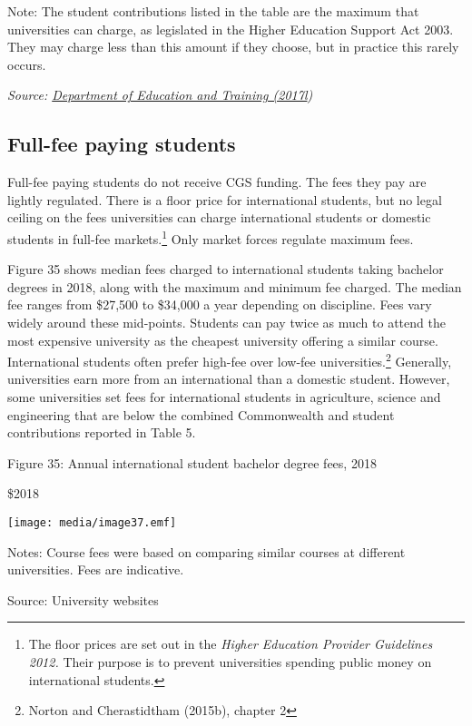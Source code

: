 \documentclass[]{book}
\begin{document}
Note: The student contributions listed in the table are the maximum that universities can charge, as legislated in the Higher Education Support Act 2003. They may charge less than this amount if they choose, but in practice this rarely occurs.

\emph{Source: \protect\hyperlink{_ENREF_78}{Department of Education and Training (2017l})}

\hypertarget{full-fee-paying-students}{%
\subsection{Full-fee paying students}\label{full-fee-paying-students}}

Full-fee paying students do not receive CGS funding. The fees they pay are lightly regulated. There is a floor price for international students, but no legal ceiling on the fees universities can charge international students or domestic students in full-fee markets.\footnote{The floor prices are set out in the \emph{Higher Education Provider Guidelines 2012.} Their purpose is to prevent universities spending public money on international students.} Only market forces regulate maximum fees.

Figure 35 shows median fees charged to international students taking bachelor degrees in 2018, along with the maximum and minimum fee charged. The median fee ranges from \$27,500 to \$34,000 a year depending on discipline. Fees vary widely around these mid-points. Students can pay twice as much to attend the most expensive university as the cheapest university offering a similar course. International students often prefer high-fee over low-fee universities.\footnote{Norton and Cherastidtham (2015b), chapter 2} Generally, universities earn more from an international than a domestic student. However, some universities set fees for international students in agriculture, science and engineering that are below the combined Commonwealth and student contributions reported in Table 5.

\protect\hypertarget{_Ref395284723}{}{}Figure 35: Annual international student bachelor degree fees, 2018

\$2018

\texttt{[image: media/image37.emf]}

Notes: Course fees were based on comparing similar courses at different universities. Fees are indicative.

Source: University websites
\end{document}
